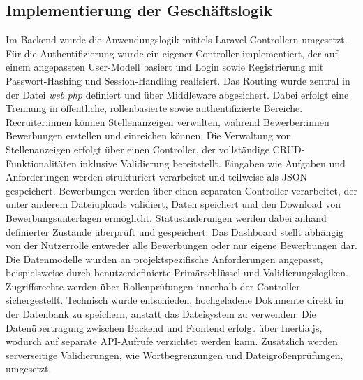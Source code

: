 \subsection{Implementierung der Geschäftslogik}
Im Backend wurde die Anwendungslogik mittels Laravel-Controllern umgesetzt. 
Für die Authentifizierung wurde ein eigener Controller implementiert, der auf einem angepassten User-Modell basiert und Login sowie Registrierung mit Passwort-Hashing und Session-Handling realisiert.
\newline
Das Routing wurde zentral in der Datei \textit{web.php} definiert und über Middleware abgesichert. 
Dabei erfolgt eine Trennung in öffentliche, rollenbasierte sowie authentifizierte Bereiche. 
Recruiter:innen können Stellenanzeigen verwalten, während Bewerber:innen Bewerbungen erstellen und einreichen können.
\newline
Die Verwaltung von Stellenanzeigen erfolgt über einen Controller, der vollständige CRUD-Funktionalitäten inklusive Validierung bereitstellt. 
Eingaben wie Aufgaben und Anforderungen werden strukturiert verarbeitet und teilweise als JSON gespeichert. 
Bewerbungen werden über einen separaten Controller verarbeitet, der unter anderem Dateiuploads validiert, Daten speichert und den Download von Bewerbungsunterlagen ermöglicht. 
Statusänderungen werden dabei anhand definierter Zustände überprüft und gespeichert.
\newline
Das Dashboard stellt abhängig von der Nutzerrolle entweder alle Bewerbungen oder nur eigene Bewerbungen dar. 
Die Datenmodelle wurden an projektspezifische Anforderungen angepasst, beispielsweise durch benutzerdefinierte Primärschlüssel und Validierungslogiken. 
Zugriffsrechte werden über Rollenprüfungen innerhalb der Controller sichergestellt.
\newline
Technisch wurde entschieden, hochgeladene Dokumente direkt in der Datenbank zu speichern, anstatt das Dateisystem zu verwenden. 
Die Datenübertragung zwischen Backend und Frontend erfolgt über Inertia.js, wodurch auf separate API-Aufrufe verzichtet werden kann. 
Zusätzlich werden serverseitige Validierungen, wie Wortbegrenzungen und Dateigrößenprüfungen, umgesetzt.
